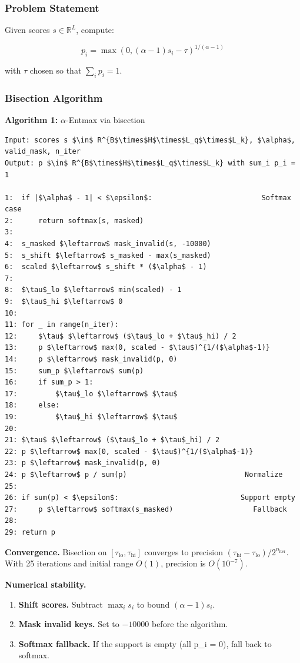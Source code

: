 \subsubsection{Problem Statement}

Given scores $s \in \mathbb{R}^{L}$, compute:

\[
p_i = \max(0, (\alpha - 1) s_i - \tau)^{1/(\alpha - 1)}
\tag{4.1}
\]

with $\tau$ chosen so that $\sum_i p_i = 1$.

\subsubsection{Bisection Algorithm}

\textbf{Algorithm 1:} $\alpha$-Entmax via bisection
\begin{lstlisting}
Input: scores s $\in$ R^{B$\times$H$\times$L_q$\times$L_k}, $\alpha$, valid_mask, n_iter
Output: p $\in$ R^{B$\times$H$\times$L_q$\times$L_k} with sum_i p_i = 1

1:  if |$\alpha$ - 1| < $\epsilon$:                          Softmax case
2:      return softmax(s, masked)
3:
4:  s_masked $\leftarrow$ mask_invalid(s, -10000)
5:  s_shift $\leftarrow$ s_masked - max(s_masked)
6:  scaled $\leftarrow$ s_shift * ($\alpha$ - 1)
7:
8:  $\tau$_lo $\leftarrow$ min(scaled) - 1
9:  $\tau$_hi $\leftarrow$ 0
10:
11: for _ in range(n_iter):
12:     $\tau$ $\leftarrow$ ($\tau$_lo + $\tau$_hi) / 2
13:     p $\leftarrow$ max(0, scaled - $\tau$)^{1/($\alpha$-1)}
14:     p $\leftarrow$ mask_invalid(p, 0)
15:     sum_p $\leftarrow$ sum(p)
16:     if sum_p > 1:
17:         $\tau$_lo $\leftarrow$ $\tau$
18:     else:
19:         $\tau$_hi $\leftarrow$ $\tau$
20:
21: $\tau$ $\leftarrow$ ($\tau$_lo + $\tau$_hi) / 2
22: p $\leftarrow$ max(0, scaled - $\tau$)^{1/($\alpha$-1)}
23: p $\leftarrow$ mask_invalid(p, 0)
24: p $\leftarrow$ p / sum(p)                            Normalize
25:
26: if sum(p) < $\epsilon$:                             Support empty
27:     p $\leftarrow$ softmax(s_masked)                   Fallback
28:
29: return p
\end{lstlisting}

\textbf{Convergence.} Bisection on $[\tau_\text{lo}, \tau_\text{hi}]$ converges 
to precision $(\tau_\text{hi} - \tau_\text{lo}) / 2^{n_\text{iter}}$. With 
25 iterations and initial range $O(1)$, precision is $O(10^{-7})$.

\textbf{Numerical stability.}

\begin{enumerate}
\item \textbf{Shift scores.} Subtract $\max_i s_i$ to bound $(\alpha - 1) s_i$.
\item \textbf{Mask invalid keys.} Set to $-10000$ before the algorithm.
\item \textbf{Softmax fallback.} If the support is empty (all p\_i = 0), fall back
  to softmax.

\end{enumerate}
